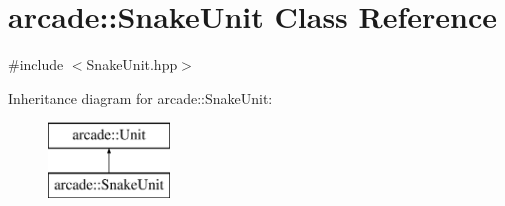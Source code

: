 \hypertarget{classarcade_1_1_snake_unit}{}\section{arcade\+:\+:Snake\+Unit Class Reference}
\label{classarcade_1_1_snake_unit}


{\ttfamily \#include $<$Snake\+Unit.\+hpp$>$}

Inheritance diagram for arcade\+:\+:Snake\+Unit\+:\begin{figure}[H]
\begin{center}
\leavevmode
\includegraphics[height=2.000000cm]{classarcade_1_1_snake_unit}
\end{center}
\end{figure}
